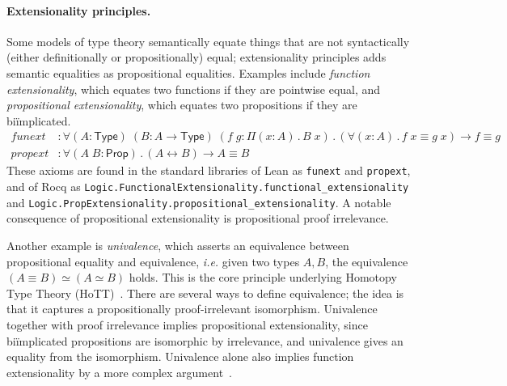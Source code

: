 \documentclass{article}
\makeatletter
\newcommand{\ie}{\textit{i.e.}\@\xspace}
\newcommand{\kw}[1]{\mathsf{#1}}
\newcommand{\code}[1]{\texttt{#1}}
\makeatother
\begin{document}
\paragraph{Extensionality principles.}
Some models of type theory semantically equate things
that are not syntactically (either definitionally or propositionally) equal;
extensionality principles adds semantic equalities as propositional equalities.
Examples include \emph{function extensionality},
which equates two functions if they are pointwise equal,
and \emph{propositional extensionality},
which equates two propositions if they are bi\"implicated.
%
\begin{align*}
  \mathit{funext} &: \forall (A : \kw{Type}) \; (B : A \to \kw{Type}) \; (f \; g : \Pi (x : A) \mathpunct{.} B \; x) \mathpunct{.}
    (\forall (x : A) \mathpunct{.} f \; x \equiv g \; x) \to f \equiv g \\
  \mathit{propext} &: \forall (A \; B : \kw{Prop}) \mathpunct{.} (A \leftrightarrow B) \to A \equiv B
\end{align*}
%
These axioms are found in the standard libraries of Lean as \code{funext} and \code{propext},
and of Rocq as \code{Logic.{\allowbreak}FunctionalExtensionality.{\allowbreak}functional\_{\allowbreak}extensionality}
and \code{Logic.{\allowbreak}PropExtensionality.{\allowbreak}propositional\_{\allowbreak}extensionality}.
A notable consequence of propositional extensionality is propositional proof irrelevance.

Another example is \emph{univalence},
which asserts an equivalence between propositional equality and equivalence,
\ie given two types $A, B$,
the equivalence $(A \equiv B) \simeq (A \simeq B)$ holds.
This is the core principle underlying Homotopy Type Theory (HoTT)~\citep{hott}.
There are several ways to define equivalence;
the idea is that it captures a propositionally proof-irrelevant isomorphism.
Univalence together with proof irrelevance implies propositional extensionality,
since bi\"implicated propositions are isomorphic by irrelevance,
and univalence gives an equality from the isomorphism.
Univalence alone also implies function extensionality
by a more complex argument~\cite[Chapter 4.9]{hott}.
\end{document}
